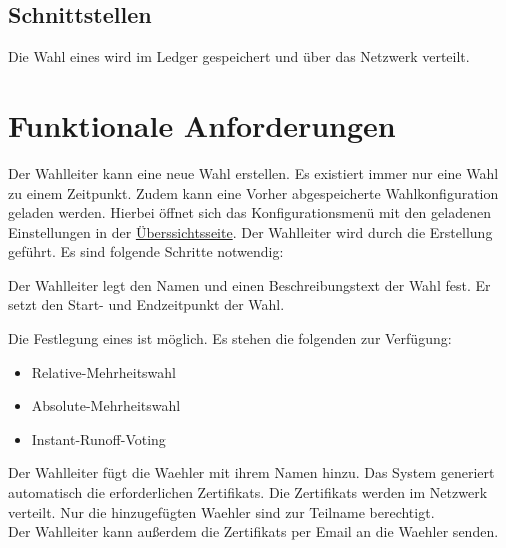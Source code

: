 \documentclass[parskip=full,11pt,twoside]{scrartcl}
\begin{document}
\subsection{Schnittstellen}
Die \gls{Wahl} eines  wird im \gls{Ledger} gespeichert und über das Netzwerk verteilt.

\section{Funktionale Anforderungen}

Der \gls{Wahlleiter} kann eine neue \gls{Wahl} erstellen. Es existiert immer nur eine \gls{Wahl} zu einem Zeitpunkt.
Zudem kann eine Vorher abgespeicherte Wahlkonfiguration geladen werden. Hierbei öffnet sich das Konfigurationsmenü mit den geladenen Einstellungen in der \hyperref[fig:wlltr-done]{Überssichtsseite}.
Der \gls{Wahlleiter} wird durch die Erstellung geführt. Es sind folgende Schritte notwendig:

Der \gls{Wahlleiter} legt den Namen und einen Beschreibungstext der \gls{Wahl} fest.
Er setzt den Start- und Endzeitpunkt der Wahl.

Die Festlegung eines  ist möglich. Es stehen die folgenden zur Verfügung:
\begin{itemize}
	\item \gls{Relative-Mehrheitswahl}
	\item \gls{Absolute-Mehrheitswahl}
	\item \gls{Instant-Runoff-Voting}
\end{itemize}

Der \gls{Wahlleiter} fügt die \gls{Waehler} mit ihrem Namen hinzu. Das System generiert automatisch die erforderlichen \glspl{Zertifikat}. Die \glspl{Zertifikat} werden im Netzwerk verteilt. Nur die hinzugefügten \gls{Waehler} sind zur Teilname berechtigt. \\
Der \gls{Wahlleiter} kann außerdem die \glspl{Zertifikat} per Email an die \gls{Waehler} senden. %
\end{document}
